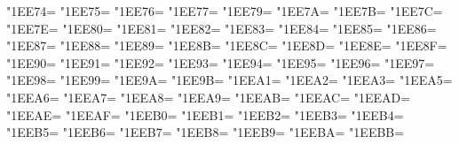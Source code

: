 \XeTeXcharclass"1EE74=\KclassArabU
\XeTeXcharclass"1EE75=\KclassArabU
\XeTeXcharclass"1EE76=\KclassArabU
\XeTeXcharclass"1EE77=\KclassArabU
\XeTeXcharclass"1EE79=\KclassArabU
\XeTeXcharclass"1EE7A=\KclassArabU
\XeTeXcharclass"1EE7B=\KclassArabU
\XeTeXcharclass"1EE7C=\KclassArabU
\XeTeXcharclass"1EE7E=\KclassArabU
\XeTeXcharclass"1EE80=\KclassArabU
\XeTeXcharclass"1EE81=\KclassArabU
\XeTeXcharclass"1EE82=\KclassArabU
\XeTeXcharclass"1EE83=\KclassArabU
\XeTeXcharclass"1EE84=\KclassArabU
\XeTeXcharclass"1EE85=\KclassArabU
\XeTeXcharclass"1EE86=\KclassArabU
\XeTeXcharclass"1EE87=\KclassArabU
\XeTeXcharclass"1EE88=\KclassArabU
\XeTeXcharclass"1EE89=\KclassArabU
\XeTeXcharclass"1EE8B=\KclassArabU
\XeTeXcharclass"1EE8C=\KclassArabU
\XeTeXcharclass"1EE8D=\KclassArabU
\XeTeXcharclass"1EE8E=\KclassArabU
\XeTeXcharclass"1EE8F=\KclassArabU
\XeTeXcharclass"1EE90=\KclassArabU
\XeTeXcharclass"1EE91=\KclassArabU
\XeTeXcharclass"1EE92=\KclassArabU
\XeTeXcharclass"1EE93=\KclassArabU
\XeTeXcharclass"1EE94=\KclassArabU
\XeTeXcharclass"1EE95=\KclassArabU
\XeTeXcharclass"1EE96=\KclassArabU
\XeTeXcharclass"1EE97=\KclassArabU
\XeTeXcharclass"1EE98=\KclassArabU
\XeTeXcharclass"1EE99=\KclassArabU
\XeTeXcharclass"1EE9A=\KclassArabU
\XeTeXcharclass"1EE9B=\KclassArabU
\XeTeXcharclass"1EEA1=\KclassArabU
\XeTeXcharclass"1EEA2=\KclassArabU
\XeTeXcharclass"1EEA3=\KclassArabU
\XeTeXcharclass"1EEA5=\KclassArabU
\XeTeXcharclass"1EEA6=\KclassArabU
\XeTeXcharclass"1EEA7=\KclassArabU
\XeTeXcharclass"1EEA8=\KclassArabU
\XeTeXcharclass"1EEA9=\KclassArabU
\XeTeXcharclass"1EEAB=\KclassArabU
\XeTeXcharclass"1EEAC=\KclassArabU
\XeTeXcharclass"1EEAD=\KclassArabU
\XeTeXcharclass"1EEAE=\KclassArabU
\XeTeXcharclass"1EEAF=\KclassArabU
\XeTeXcharclass"1EEB0=\KclassArabU
\XeTeXcharclass"1EEB1=\KclassArabU
\XeTeXcharclass"1EEB2=\KclassArabU
\XeTeXcharclass"1EEB3=\KclassArabU
\XeTeXcharclass"1EEB4=\KclassArabU
\XeTeXcharclass"1EEB5=\KclassArabU
\XeTeXcharclass"1EEB6=\KclassArabU
\XeTeXcharclass"1EEB7=\KclassArabU
\XeTeXcharclass"1EEB8=\KclassArabU
\XeTeXcharclass"1EEB9=\KclassArabU
\XeTeXcharclass"1EEBA=\KclassArabU
\XeTeXcharclass"1EEBB=\KclassArabU

